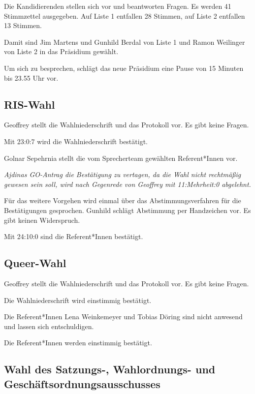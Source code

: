\documentclass[ngerman,headheight=70pt]{scrartcl}
\begin{document}
    Die Kandidierenden stellen sich vor und beantworten Fragen.
    Es werden 41 Stimmzettel ausgegeben.
    Auf Liste 1 entfallen 28 Stimmen, auf Liste 2 entfallen 13 Stimmen.

    Damit sind Jim Martens und Gunhild Berdal von Liste 1 und Ramon Weilinger
    von Liste 2 in das Präsidium gewählt.

    Um sich zu besprechen, schlägt das neue Präsidium eine Pause von 15 Minuten
    bis 23.55 Uhr vor.

    \subsection{RIS-Wahl}

    Geoffrey stellt die Wahlniederschrift und das Protokoll vor. Es gibt
    keine Fragen.

    Mit 23:0:7 wird die Wahlniederschrift bestätigt.

    Golnar Sepehrnia stellt die vom Sprecherteam gewählten Referent*Innen vor.

    \textit{Ajdinas GO-Antrag die Bestätigung zu vertagen, da die Wahl nicht
    rechtmäßig gewesen sein soll, wird nach Gegenrede von Geoffrey mit
    11:Mehrheit:0 abgelehnt.}

    Für das weitere Vorgehen wird einmal über das Abstimmungsverfahren für die
    Bestätigungen gesprochen. Gunhild schlägt Abstimmung per Handzeichen vor.
    Es gibt keinen Widerspruch.

    Mit 24:10:0 sind die Referent*Innen bestätigt.

    \subsection{Queer-Wahl}

    Geoffrey stellt die Wahlniederschrift und das Protokoll vor. Es gibt
    keine Fragen.

    Die Wahlniederschrift wird einstimmig bestätigt.

    Die Referent*Innen Lena Weinkemeyer und Tobias Döring sind nicht anwesend
    und lassen sich entschuldigen.

    Die Referent*Innen werden einstimmig bestätigt.

    \subsection{Wahl des Satzungs-, Wahlordnungs- und Geschäftsordnungsausschusses}
\end{document}
